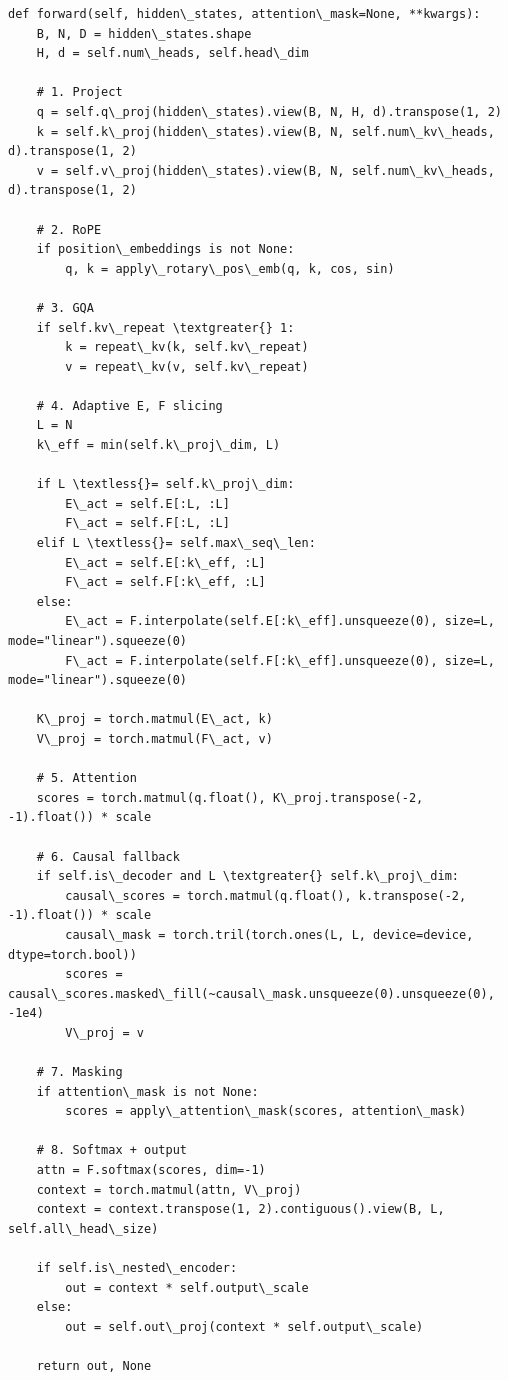 \begin{lstlisting}
def forward(self, hidden\_states, attention\_mask=None, **kwargs):
    B, N, D = hidden\_states.shape
    H, d = self.num\_heads, self.head\_dim
    
    # 1. Project
    q = self.q\_proj(hidden\_states).view(B, N, H, d).transpose(1, 2)
    k = self.k\_proj(hidden\_states).view(B, N, self.num\_kv\_heads, d).transpose(1, 2)
    v = self.v\_proj(hidden\_states).view(B, N, self.num\_kv\_heads, d).transpose(1, 2)
    
    # 2. RoPE
    if position\_embeddings is not None:
        q, k = apply\_rotary\_pos\_emb(q, k, cos, sin)
    
    # 3. GQA
    if self.kv\_repeat \textgreater{} 1:
        k = repeat\_kv(k, self.kv\_repeat)
        v = repeat\_kv(v, self.kv\_repeat)
    
    # 4. Adaptive E, F slicing
    L = N
    k\_eff = min(self.k\_proj\_dim, L)
    
    if L \textless{}= self.k\_proj\_dim:
        E\_act = self.E[:L, :L]
        F\_act = self.F[:L, :L]
    elif L \textless{}= self.max\_seq\_len:
        E\_act = self.E[:k\_eff, :L]
        F\_act = self.F[:k\_eff, :L]
    else:
        E\_act = F.interpolate(self.E[:k\_eff].unsqueeze(0), size=L, mode="linear").squeeze(0)
        F\_act = F.interpolate(self.F[:k\_eff].unsqueeze(0), size=L, mode="linear").squeeze(0)
    
    K\_proj = torch.matmul(E\_act, k)
    V\_proj = torch.matmul(F\_act, v)
    
    # 5. Attention
    scores = torch.matmul(q.float(), K\_proj.transpose(-2, -1).float()) * scale
    
    # 6. Causal fallback
    if self.is\_decoder and L \textgreater{} self.k\_proj\_dim:
        causal\_scores = torch.matmul(q.float(), k.transpose(-2, -1).float()) * scale
        causal\_mask = torch.tril(torch.ones(L, L, device=device, dtype=torch.bool))
        scores = causal\_scores.masked\_fill(~causal\_mask.unsqueeze(0).unsqueeze(0), -1e4)
        V\_proj = v
    
    # 7. Masking
    if attention\_mask is not None:
        scores = apply\_attention\_mask(scores, attention\_mask)
    
    # 8. Softmax + output
    attn = F.softmax(scores, dim=-1)
    context = torch.matmul(attn, V\_proj)
    context = context.transpose(1, 2).contiguous().view(B, L, self.all\_head\_size)
    
    if self.is\_nested\_encoder:
        out = context * self.output\_scale
    else:
        out = self.out\_proj(context * self.output\_scale)
    
    return out, None
\end{lstlisting}

